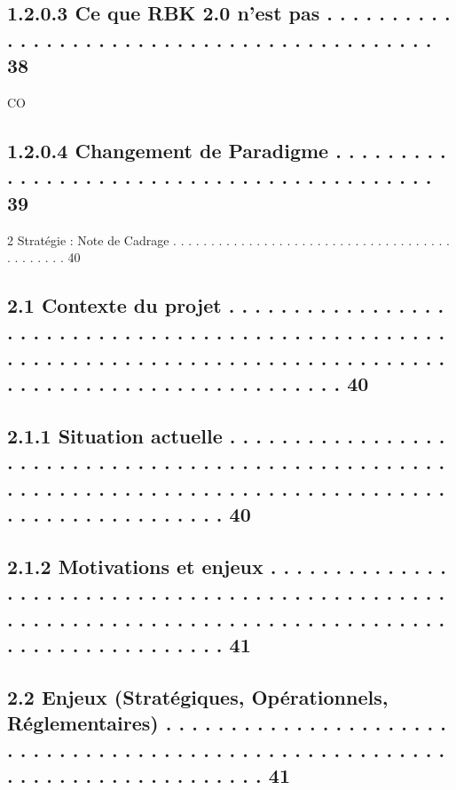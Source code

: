 \documentclass[12pt,landscape,a4paper]{article}
\begin{document}
\subsection{1.2.0.3 Ce que RBK 2.0 n’est pas . . . . . . . . . . . . . . . . . . . . . . . . . . . . . . . . . . . . . . . . . . .                                                                                                                       38}
CO\\
\subsection{1.2.0.4 Changement de Paradigme . . . . . . . . . . . . . . . . . . . . . . . . . . . . . . . . . . . . . . . . . .                                                                                                                          39}
2     Stratégie : Note de Cadrage . . . . . . . . . . . . . . . . . . . . . . . . . . . . . . . . . . . . . . . . . . . . . 40\\
\subsection{2.1     Contexte du projet . . . . . . . . . . . . . . . . . . . . . . . . . . . . . . . . . . . . . . . . . . . . . . . . . . . . . . . . . . . . . . . . . . . . . . . . . . . . . . . . . . . . . . . . . . . . . . . . . . . . . . . . . . . . . . . 40}
\subsection{2.1.1               Situation actuelle . . . . . . . . . . . . . . . . . . . . . . . . . . . . . . . . . . . . . . . . . . . . . . . . . . . . . . . . . . . . . . . . . . . . . . . . . . . . . . . . . . . . . . . . . . . . . . . . . . . . . . 40}
\subsection{2.1.2               Motivations et enjeux . . . . . . . . . . . . . . . . . . . . . . . . . . . . . . . . . . . . . . . . . . . . . . . . . . . . . . . . . . . . . . . . . . . . . . . . . . . . . . . . . . . . . . . . . . . . . . . . . . . 41}
\subsection{2.2     Enjeux (Stratégiques, Opérationnels, Réglementaires) . . . . . . . . . . . . . . . . . . . . . . . . . . . . . . . . . . . . . . . . . . . . . . . . . . . . . . . . . . . . . . . . . . . . . . . . . . . . 41}
\end{document}

